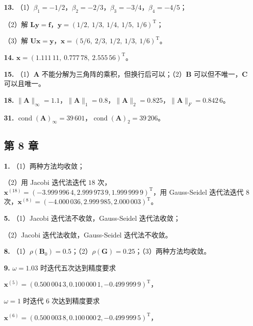 \documentclass[
  10pt,
  fontset=fandol]{ctexart}
\begin{document}
\textbf{13.} （1）\(\beta_1=-1/2\)，\(\beta_2=-2/3\)，\(\beta_3=-3/4\)，\(\beta_4=-4/5\)；

（2）解 \(\boldsymbol{L}\boldsymbol{y}=\boldsymbol{f}\)，\(\boldsymbol{y}=(1/2,\ 1/3,\ 1/4,\ 1/5,\ 1/6)^{\mathrm{T}}\)；

（3）解 \(\boldsymbol{U}\boldsymbol{x}=\boldsymbol{y}\)，\(\boldsymbol{x}=(5/6,\ 2/3,\ 1/2,\ 1/3,\ 1/6)^{\mathrm{T}}\)。

\textbf{14.} \(\boldsymbol{x}=(1.111\,11,\allowbreak \ 0.777\,78,\allowbreak \ 2.555\,56)^{\mathrm{T}}\)。

\textbf{15.} （1）\(\boldsymbol{A}\) 不能分解为三角阵的乘积，但换行后可以；（2）\(\boldsymbol{B}\) 可以但不唯一，\(\boldsymbol{C}\) 可以且唯一。

\textbf{18.} \(\|\boldsymbol{A}\|_{\infty}=1.1\)，\(\|\boldsymbol{A}\|_1=0.8\)，\(\|\boldsymbol{A}\|_2=0.825\)，\(\|\boldsymbol{A}\|_F=0.842\,6\)。

\textbf{31.} \(\operatorname{cond}(\boldsymbol{A})_{\infty}=39\,601\)，\(\operatorname{cond}(\boldsymbol{A})_2=39\,206\)。

\subsection{第 8 章}\label{ux7b2c-8-ux7ae0}

\textbf{1.} （1）两种方法均收敛；

（2）用 Jacobi 迭代法迭代 \(18\) 次，\(\boldsymbol{x}^{(18)}=(-3.999\,996\,4,\allowbreak 2.999\,973\,9,\allowbreak 1.999\,999\,9)^{\mathrm{T}}\)，用 Gauss-Seidel 迭代法迭代 \(8\) 次，\(\boldsymbol{x}^{(8)}=(-4.000\,036,\allowbreak 2.999\,985,\allowbreak 2.000\,003)^{\mathrm{T}}\)。

\textbf{5.} （1）Jacobi 迭代法不收敛，Gauss-Seidel 迭代法收敛；

（2）Jacobi 迭代法收敛，Gauss-Seidel 迭代法不收敛。

\textbf{8.} （1）\(\rho(\boldsymbol{B}_0)=0.5\)；（2）\(\rho(\boldsymbol{G})=0.25\)；（3）两种方法均收敛。

\textbf{9.} \(\omega=1.03\) 时迭代五次达到精度要求

\(\boldsymbol{x}^{(5)}=(0.500\,004\,3,\allowbreak 0.100\,000\,1,\allowbreak -0.499\,999\,9)^{\mathrm{T}}\)，

\(\omega=1\) 时迭代 \(6\) 次达到精度要求

\(\boldsymbol{x}^{(6)}=(0.500\,003\,8,\allowbreak 0.100\,000\,2,\allowbreak -0.499\,999\,5)^{\mathrm{T}}\)，
\end{document}
